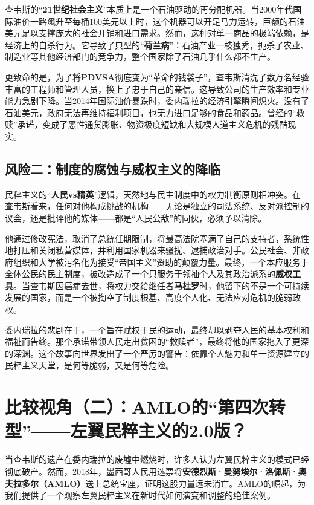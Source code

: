 查韦斯的“\textbf{21世纪社会主义}”本质上是一个石油驱动的再分配机器。当2000年代国际油价一路飙升至每桶100美元以上时，这个机器可以开足马力运转，巨额的石油美元足以支撑庞大的社会开销和进口需求。然而，这种对单一商品的极端依赖，是经济上的自杀行为。它导致了典型的“\textbf{荷兰病}”：石油产业一枝独秀，扼杀了农业、制造业等其他经济部门的竞争力，整个国家除了石油几乎什么都不生产。

更致命的是，为了将\textbf{PDVSA}彻底变为“革命的钱袋子”，查韦斯清洗了数万名经验丰富的工程师和管理人员，换上了忠于自己的亲信。这导致公司的生产效率和专业能力急剧下降。当2014年国际油价暴跌时，委内瑞拉的经济引擎瞬间熄火。没有了石油美元，政府无法再维持福利项目，也无力进口足够的食品和药品。曾经的“救赎”承诺，变成了恶性通货膨胀、物资极度短缺和大规模人道主义危机的残酷现实。

\subsection{风险二：制度的腐蚀与威权主义的降临}

民粹主义的“\textbf{人民vs精英}”逻辑，天然地与民主制度中的权力制衡原则相冲突。在查韦斯看来，任何对他构成挑战的机构——无论是独立的司法系统、反对派控制的议会，还是批评他的媒体——都是“人民公敌”的同伙，必须予以清除。

他通过修改宪法，取消了总统任期限制，将最高法院塞满了自己的支持者，系统性地打压和关闭私营媒体，并利用国家机器来骚扰、逮捕政治对手。公民社会、非政府组织和大学被污名化为接受“帝国主义”资助的颠覆力量。最终，一个本应服务于全体公民的民主制度，被改造成了一个只服务于领袖个人及其政治派系的\textbf{威权工具}。当查韦斯因癌症去世，将权力交给继任者\textbf{马杜罗}时，他留下的不是一个可持续发展的国家，而是一个被掏空了制度根基、高度个人化、无法应对危机的脆弱政权。

委内瑞拉的悲剧在于，一个旨在赋权于民的运动，最终却以剥夺人民的基本权利和福祉而告终。那个承诺带领人民走出贫困的“救赎者”，最终将他的国家拖入了更深的深渊。这个故事向世界发出了一个严厉的警告：依靠个人魅力和单一资源建立的民粹主义天堂，是何等脆弱，又是何等危险。

\section{比较视角（二）：AMLO的“第四次转型”——左翼民粹主义的2.0版？}
当查韦斯的遗产在委内瑞拉的废墟中燃烧时，许多人认为左翼民粹主义的模式已经彻底破产。然而，2018年，墨西哥人民用选票将\textbf{安德烈斯·曼努埃尔·洛佩斯·奥夫拉多尔（AMLO）}送上总统宝座，证明这股力量远未消亡。AMLO的崛起，为我们提供了一个观察左翼民粹主义在新时代如何演变和调整的绝佳案例。

